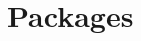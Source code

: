 \begin{comment}
\section{Supplementary Note 3}
\label{sec:suppnote3}

\subsubsection{Cell-Cell Interactions}


To infer CCIs from scRNA-seq data, CellChat makes use of \textbf{CellChatDB}, a database of literature supported LRIs, in both mouse and human. CellChatDB is specific as it contains LRIs involving multimeric receptors, cofactor molecules as well as co-stimulatory or co-inhibitory membrane bound receptors, and is grouped into several signalling pathway families. In addition, CellChatDB allows for updating of the database by adding user-defined ligand-receptor pairs. Next, to infer intercellular communications from scRNA-seq data, CellChat first identifies differential signalling genes across all cell-types in the data using the Wilcoxon rank sum test, and for these differential genes, computes the \textbf{“ensemble average expression”} in the cell-type. Following this, a communication probability value for every LRI pair is modelled based on the \textbf{Law of Mass Action} and a \textbf{Hill function}. By using the expression levels of ligands and receptors as “proxies” for their concentration and modelling interactions with expression-based Hill functions \footnote{In CellChat, the Hill function is used to incorporate the effects of positive and negative effectors into the framework, thereby providing a more nuanced and accurate model of cell-cell communication}. In addition, the frequencies of the cell-types are also accounted for in the probability calculation. Finally, significant interactions between two cell-types are identified on the basis of a random permutation test <add footnote here>   . Using centrality metrics from graph theory, CellChat identifies higher order information from a weighted-directed network, wherein the computed communication probabilities are used as weights. This allows for the identification of dominant signalling sources as well as mediators and influencers within the network. CellChat can also predict key outgoing and incoming signals for specific cell-types as well as coordinated responses amongst different cell-types by pattern recognition approaches based on non-negative matrix factorization. An important application of CellChat is the joint analyses of two or more datasets by constructing a shared manifold space using a shared nearest neighbour (SNN) similarity network. This enables the identification of conserved as well as context-specific interactions between the datasets being compared.    
\end{comment}

\chapter{Packages}
